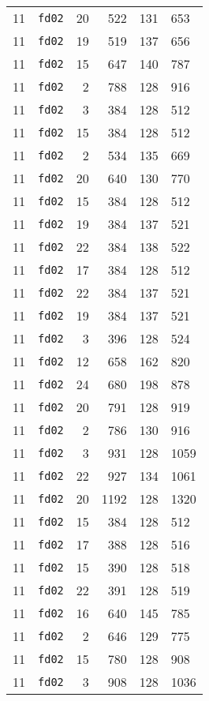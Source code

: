 \documentclass{article}
\begin{document}
\begin{table}[h!]
\begin{tabular}{llrrrl}
    11 & \texttt{fd02} & 20 & 522 & 131 & 653 \\
    11 & \texttt{fd02} & 19 & 519 & 137 & 656 \\
    11 & \texttt{fd02} & 15 & 647 & 140 & 787 \\
    11 & \texttt{fd02} & 2 & 788 & 128 & 916 \\
    11 & \texttt{fd02} & 3 & 384 & 128 & 512 \\
    11 & \texttt{fd02} & 15 & 384 & 128 & 512 \\
    11 & \texttt{fd02} & 2 & 534 & 135 & 669 \\
    11 & \texttt{fd02} & 20 & 640 & 130 & 770 \\
    11 & \texttt{fd02} & 15 & 384 & 128 & 512 \\
    11 & \texttt{fd02} & 19 & 384 & 137 & 521 \\
    11 & \texttt{fd02} & 22 & 384 & 138 & 522 \\
    11 & \texttt{fd02} & 17 & 384 & 128 & 512 \\
    11 & \texttt{fd02} & 22 & 384 & 137 & 521 \\
    11 & \texttt{fd02} & 19 & 384 & 137 & 521 \\
    11 & \texttt{fd02} & 3 & 396 & 128 & 524 \\
    11 & \texttt{fd02} & 12 & 658 & 162 & 820 \\
    11 & \texttt{fd02} & 24 & 680 & 198 & 878 \\
    11 & \texttt{fd02} & 20 & 791 & 128 & 919 \\
    11 & \texttt{fd02} & 2 & 786 & 130 & 916 \\
    11 & \texttt{fd02} & 3 & 931 & 128 & 1059 \\
    11 & \texttt{fd02} & 22 & 927 & 134 & 1061 \\
    11 & \texttt{fd02} & 20 & 1192 & 128 & 1320 \\
    11 & \texttt{fd02} & 15 & 384 & 128 & 512 \\
    11 & \texttt{fd02} & 17 & 388 & 128 & 516 \\
    11 & \texttt{fd02} & 15 & 390 & 128 & 518 \\
    11 & \texttt{fd02} & 22 & 391 & 128 & 519 \\
    11 & \texttt{fd02} & 16 & 640 & 145 & 785 \\
    11 & \texttt{fd02} & 2 & 646 & 129 & 775 \\
    11 & \texttt{fd02} & 15 & 780 & 128 & 908 \\
    11 & \texttt{fd02} & 3 & 908 & 128 & 1036 \\

\end{tabular}
\end{table}
\end{document}
